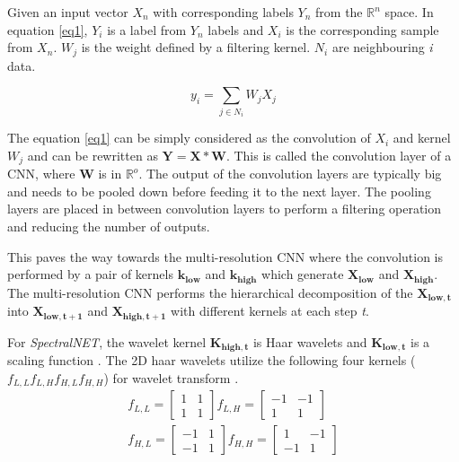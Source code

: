 \documentclass[journal]{IEEEtran}
\newcommand{\R}{\mathbb{R}}
\begin{document}
Given an input vector $X_n$ with corresponding labels $Y_n$ from the $\R^n$ space. In equation \ref{eq1}, $Y_i$ is a label from $\mathit{Y_n}$ labels and $X_i$ is the corresponding sample from $\mathit{X_n}$. $W_j$ is the weight defined by a filtering kernel. $N_i$ are neighbouring \textit{i} data.   

\begin{equation}
    y_i =  \sum_{j\in N_i} W_j X_j 
    \label{eq1}
\end{equation}

The equation \ref{eq1} can be simply considered as the convolution of $X_i$ and kernel $W_j$ and can be rewritten as $\mathbf{Y = X*W}$. This is called the convolution layer of a CNN, where $\mathbf{W}$ is in $\R^o$. The output of the convolution layers are typically big and needs to be pooled down before feeding it to the next layer. The pooling layers are placed in between convolution layers to perform a filtering operation and reducing the number of outputs. 





This paves the way towards the multi-resolution CNN where the convolution is performed by a pair of kernels $\mathbf{k_{low}}$ and $\mathbf{k_{high}}$ which generate $\mathbf{X_{low}}$ and $\mathbf{X_{high}}$. The multi-resolution CNN performs the hierarchical decomposition of the $\mathbf{X_{low,t}}$ into $\mathbf{X_{low,t+1}}$ and $\mathbf{X_{high,t+1}}$ with different kernels at each step \textit{t}. 

For \textit{SpectralNET}, the wavelet kernel $\mathbf{K_{high,t}}$ is Haar wavelets and $\mathbf{K_{low,t}}$ is a scaling function  \cite{wang2006moving}. The 2D haar wavelets utilize the following four kernels ($f_{L,L} f_{L,H} f_{H,L} f_{H,H}$) for wavelet transform \cite{liu2018multi}. 
\begin{equation}
\begin{split}
f_{L,L} =
\begin{bmatrix}
1&1\\1&1
\end{bmatrix}
f_{L,H} =
\begin{bmatrix}
-1&-1\\1&1
\end{bmatrix}
\\
f_{H,L} =
\begin{bmatrix}
-1&1\\-1&1
\end{bmatrix}
f_{H,H} =
\begin{bmatrix}
1&-1\\-1&1
\end{bmatrix}
\end{split}
\end{equation}
\end{document}
